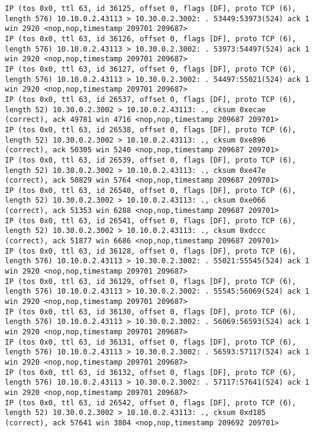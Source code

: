 \documentclass[a4paper,12pt]{article}
\begin{document}
\begin{lstlisting}
IP (tos 0x0, ttl 63, id 36125, offset 0, flags [DF], proto TCP (6), length 576) 10.10.0.2.43113 > 10.30.0.2.3002: . 53449:53973(524) ack 1 win 2920 <nop,nop,timestamp 209701 209687>
IP (tos 0x0, ttl 63, id 36126, offset 0, flags [DF], proto TCP (6), length 576) 10.10.0.2.43113 > 10.30.0.2.3002: . 53973:54497(524) ack 1 win 2920 <nop,nop,timestamp 209701 209687>
IP (tos 0x0, ttl 63, id 36127, offset 0, flags [DF], proto TCP (6), length 576) 10.10.0.2.43113 > 10.30.0.2.3002: . 54497:55021(524) ack 1 win 2920 <nop,nop,timestamp 209701 209687>
IP (tos 0x0, ttl 63, id 26537, offset 0, flags [DF], proto TCP (6), length 52) 10.30.0.2.3002 > 10.10.0.2.43113: ., cksum 0xecae (correct), ack 49781 win 4716 <nop,nop,timestamp 209687 209701>
IP (tos 0x0, ttl 63, id 26538, offset 0, flags [DF], proto TCP (6), length 52) 10.30.0.2.3002 > 10.10.0.2.43113: ., cksum 0xe896 (correct), ack 50305 win 5240 <nop,nop,timestamp 209687 209701>
IP (tos 0x0, ttl 63, id 26539, offset 0, flags [DF], proto TCP (6), length 52) 10.30.0.2.3002 > 10.10.0.2.43113: ., cksum 0xe47e (correct), ack 50829 win 5764 <nop,nop,timestamp 209687 209701>
IP (tos 0x0, ttl 63, id 26540, offset 0, flags [DF], proto TCP (6), length 52) 10.30.0.2.3002 > 10.10.0.2.43113: ., cksum 0xe066 (correct), ack 51353 win 6288 <nop,nop,timestamp 209687 209701>
IP (tos 0x0, ttl 63, id 26541, offset 0, flags [DF], proto TCP (6), length 52) 10.30.0.2.3002 > 10.10.0.2.43113: ., cksum 0xdccc (correct), ack 51877 win 6686 <nop,nop,timestamp 209687 209701>
IP (tos 0x0, ttl 63, id 36128, offset 0, flags [DF], proto TCP (6), length 576) 10.10.0.2.43113 > 10.30.0.2.3002: . 55021:55545(524) ack 1 win 2920 <nop,nop,timestamp 209701 209687>
IP (tos 0x0, ttl 63, id 36129, offset 0, flags [DF], proto TCP (6), length 576) 10.10.0.2.43113 > 10.30.0.2.3002: . 55545:56069(524) ack 1 win 2920 <nop,nop,timestamp 209701 209687>
IP (tos 0x0, ttl 63, id 36130, offset 0, flags [DF], proto TCP (6), length 576) 10.10.0.2.43113 > 10.30.0.2.3002: . 56069:56593(524) ack 1 win 2920 <nop,nop,timestamp 209701 209687>
IP (tos 0x0, ttl 63, id 36131, offset 0, flags [DF], proto TCP (6), length 576) 10.10.0.2.43113 > 10.30.0.2.3002: . 56593:57117(524) ack 1 win 2920 <nop,nop,timestamp 209701 209687>
IP (tos 0x0, ttl 63, id 36132, offset 0, flags [DF], proto TCP (6), length 576) 10.10.0.2.43113 > 10.30.0.2.3002: . 57117:57641(524) ack 1 win 2920 <nop,nop,timestamp 209701 209687>
IP (tos 0x0, ttl 63, id 26542, offset 0, flags [DF], proto TCP (6), length 52) 10.30.0.2.3002 > 10.10.0.2.43113: ., cksum 0xd185 (correct), ack 57641 win 3804 <nop,nop,timestamp 209692 209701>

\end{lstlisting}
\end{document}
